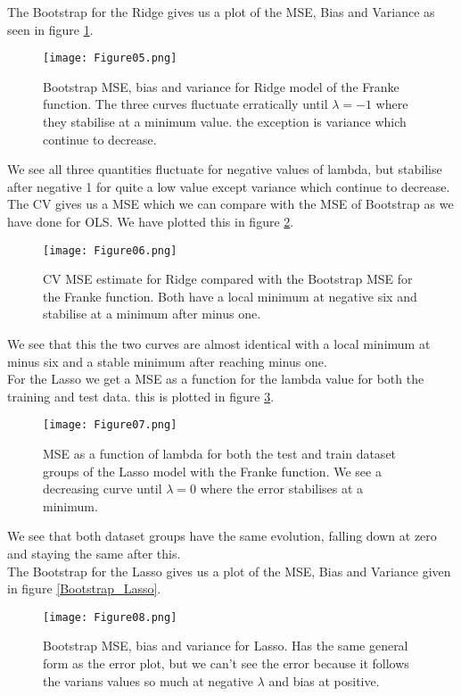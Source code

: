 \documentclass[11pt, A4paper, english]{article}
\begin{document}
\begin{multicols}{2}
The Bootstrap for the Ridge gives us a plot of the MSE, Bias and Variance as seen in figure \ref{Bootstrap_Ridge}.
			\begin{figure}[H]
\texttt{[image: Figure05.png]}
\caption{Bootstrap MSE, bias and variance for Ridge model of the Franke function. The three curves fluctuate erratically until $\lambda = -1$ where they stabilise at a minimum value. the exception is variance which continue to decrease.}
\label{Bootstrap_Ridge}
			\end{figure}
We see all three quantities fluctuate for negative values of lambda, but stabilise after negative 1 for quite a low value except variance which continue to decrease. \\
The CV gives us a MSE which we can compare with the MSE of Bootstrap as we have done for OLS. We have plotted this in figure \ref{CV_Ridge}.
			\begin{figure}[H]
\texttt{[image: Figure06.png]}
\caption{CV MSE estimate for Ridge compared with the Bootstrap MSE for the Franke function. Both have a local minimum at negative six and stabilise at a minimum after minus one.}
\label{CV_Ridge}
			\end{figure}
We see that this the two curves are almost identical with a local minimum at minus six and a stable minimum after reaching minus one. \\
For the Lasso we get a MSE as a function for the lambda value for both the training and test data. this is plotted in figure \ref{MSE_Lasso}.
			\begin{figure}[H]
\texttt{[image: Figure07.png]}
\caption{MSE as a function of lambda for both the test and train dataset groups of the Lasso model with the Franke function. We see a decreasing curve until $\lambda = 0$ where the error stabilises at a minimum.}
\label{MSE_Lasso}
			\end{figure}
We see that both dataset groups have the same evolution, falling down at zero and staying the same after this. \\
The Bootstrap for the Lasso gives us a plot of the MSE, Bias and Variance given in figure \ref{Bootstrap_Lasso}.
			\begin{figure}[H]
\texttt{[image: Figure08.png]}
\caption{Bootstrap MSE, bias and variance for Lasso. Has the same general form as the error plot, but we can't see the error because it follows the varians values so much at negative $\lambda$ and bias at positive.}

\end{figure}
\end{multicols}
\end{document}
